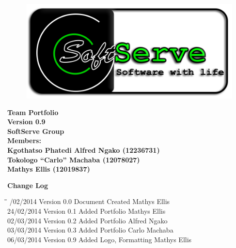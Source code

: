 \documentclass[12pt]{article}
\newcommand{\Title}{Team Portfolio} %
\begin{document}
	\begin{center}%
		\begin{figure}[ht!]
			\centering
			\includegraphics{./Pictures/logo.png}
		\end{figure}
		\LARGE \bf \Title \\
		{\bf Version 0.9}\\[4em]
		\LARGE {\bf SoftServe Group }\\[1em]
		\LARGE {\bf Members:}\\[2em]
		\large
		Kgothatso Phatedi Alfred Ngako		(12236731) \\[1em]
		Tokologo “Carlo” Machaba			(12078027) \\[1em]
		Mathys Ellis						(12019837) \\[8em]
			    
	\end{center}%
	
	\newpage
	{\LARGE \bf Change Log}\\[2em]	
		\begin{tabbing}
			\hspace*{3cm}\=\hspace*{3cm}\=\hspace*{8cm}\=\hspace*{3cm} /02/2014 \> Version 0.0 \> Document Created \> Mathys Ellis\\ 
			24/02/2014 \> Version 0.1 \> Added Portfolio \> Mathys Ellis\\
			02/03/2014 \> Version 0.2 \> Added Portfolio \> Alfred Ngako\\
			03/03/2014 \> Version 0.3 \> Added Portfolio \> Carlo Machaba\\
			06/03/2014 \> Version 0.9 \> Added Logo, Formatting \> Mathys Ellis\\
		\end{tabbing}
			
	\newpage
		\tableofcontents
			
	\newpage
\end{document}
